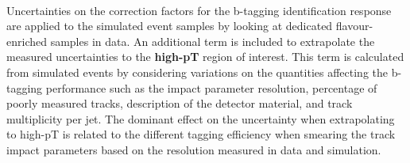 \paragraph{}
Uncertainties on the correction factors for the b-tagging identification response are applied to the simulated event samples by looking at dedicated flavour-enriched samples in data. An additional term is included to extrapolate the measured uncertainties to the \textbf{high-pT} region of interest. This term is calculated from simulated events by considering variations on the quantities affecting the b-tagging performance such as the impact parameter resolution, percentage of poorly measured tracks, description of the detector material, and track multiplicity per jet. The dominant effect on the uncertainty when extrapolating to high-pT is related to the different tagging efficiency when smearing the track impact parameters based on the resolution measured in data and simulation.



